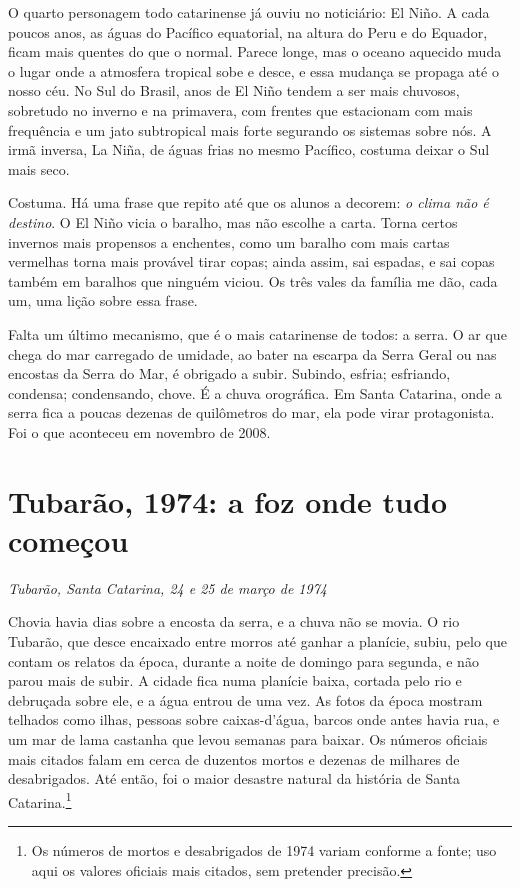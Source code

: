 \documentclass[
  brazilian,
  11pt,
  openany]{book}
\begin{document}
O quarto personagem todo catarinense já ouviu no noticiário: El Niño. A
cada poucos anos, as águas do Pacífico equatorial, na altura do Peru e
do Equador, ficam mais quentes do que o normal. Parece longe, mas o
oceano aquecido muda o lugar onde a atmosfera tropical sobe e desce, e
essa mudança se propaga até o nosso céu. No Sul do Brasil, anos de El
Niño tendem a ser mais chuvosos, sobretudo no inverno e na primavera,
com frentes que estacionam com mais frequência e um jato subtropical
mais forte segurando os sistemas sobre nós. A irmã inversa, La Niña, de
águas frias no mesmo Pacífico, costuma deixar o Sul mais seco.

Costuma. Há uma frase que repito até que os alunos a decorem: \emph{o
clima não é destino}. O El Niño vicia o baralho, mas não escolhe a
carta. Torna certos invernos mais propensos a enchentes, como um baralho
com mais cartas vermelhas torna mais provável tirar copas; ainda assim,
sai espadas, e sai copas também em baralhos que ninguém viciou. Os três
vales da família me dão, cada um, uma lição sobre essa frase.

Falta um último mecanismo, que é o mais catarinense de todos: a serra. O
ar que chega do mar carregado de umidade, ao bater na escarpa da Serra
Geral ou nas encostas da Serra do Mar, é obrigado a subir. Subindo,
esfria; esfriando, condensa; condensando, chove. É a chuva orográfica.
Em Santa Catarina, onde a serra fica a poucas dezenas de quilômetros do
mar, ela pode virar protagonista. Foi o que aconteceu em novembro de
2008.

\section{Tubarão, 1974: a foz onde tudo
começou}\label{tubaruxe3o-1974-a-foz-onde-tudo-comeuxe7ou}

\emph{Tubarão, Santa Catarina, 24 e 25 de março de 1974}

Chovia havia dias sobre a encosta da serra, e a chuva não se movia. O
rio Tubarão, que desce encaixado entre morros até ganhar a planície,
subiu, pelo que contam os relatos da época, durante a noite de domingo
para segunda, e não parou mais de subir. A cidade fica numa planície
baixa, cortada pelo rio e debruçada sobre ele, e a água entrou de uma
vez. As fotos da época mostram telhados como ilhas, pessoas sobre
caixas-d'água, barcos onde antes havia rua, e um mar de lama castanha
que levou semanas para baixar. Os números oficiais mais citados falam em
cerca de duzentos mortos e dezenas de milhares de desabrigados. Até
então, foi o maior desastre natural da história de Santa
Catarina.\footnote{Os números de mortos e desabrigados de 1974 variam
  conforme a fonte; uso aqui os valores oficiais mais citados, sem
  pretender precisão.}
\end{document}
